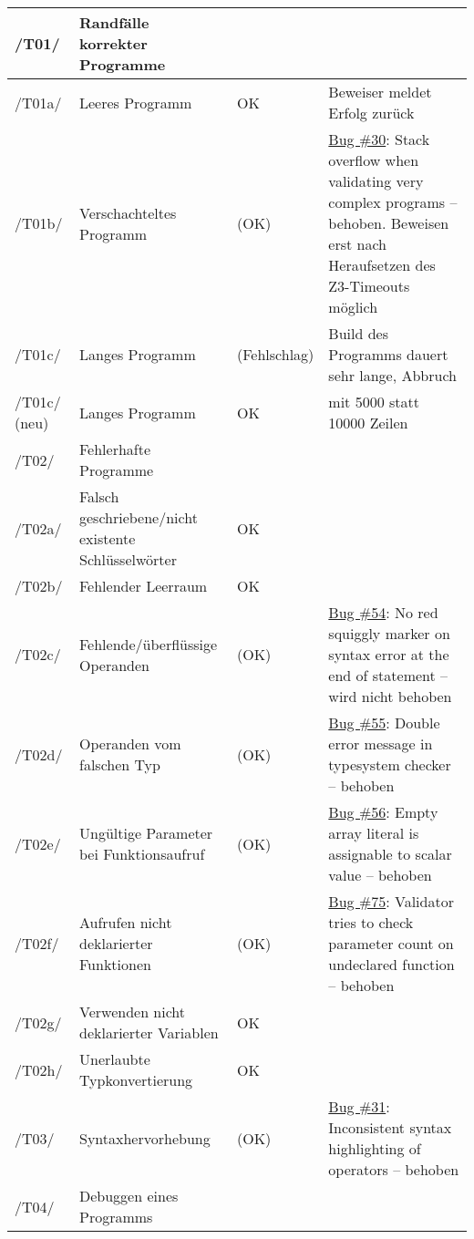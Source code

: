 \begin{landscape}
\begin{longtable}{lp{8cm}lp{10cm}}
/T01/ & Randfälle korrekter Programme &  &  \\ \midrule
/T01a/ & Leeres Programm & OK & Beweiser meldet Erfolg zurück \\ \midrule
/T01b/ & Verschachteltes Programm & (OK) & \href{https://github.com/team-worthwhile/worthwhile/issues/30}{\href{https://github.com/team-worthwhile/worthwhile/issues/30}{Bug \#30}}: Stack overflow when validating very complex programs – behoben. Beweisen erst nach Heraufsetzen des Z3-Timeouts möglich \\ \midrule
/T01c/ & Langes Programm & (Fehlschlag) & Build des Programms dauert sehr lange, Abbruch \\ \midrule
/T01c/ (neu) & Langes Programm & OK & mit 5000 statt 10000 Zeilen \\ \midrule
\midrule
/T02/ & Fehlerhafte Programme &  &  \\ \midrule
/T02a/ & Falsch geschriebene/nicht existente Schlüsselwörter & OK &  \\ \midrule
/T02b/ & Fehlender Leerraum & OK &  \\ \midrule
/T02c/ & Fehlende/überflüssige Operanden & (OK) & \href{https://github.com/team-worthwhile/worthwhile/issues/54}{Bug \#54}: No red squiggly marker on syntax error at the end of statement -- wird nicht behoben \\ \midrule
/T02d/ & Operanden vom falschen Typ & (OK) & \href{https://github.com/team-worthwhile/worthwhile/issues/55}{Bug \#55}: Double error message in typesystem checker – behoben \\ \midrule
/T02e/ & Ungültige Parameter bei Funktionsaufruf & (OK) & \href{https://github.com/team-worthwhile/worthwhile/issues/56}{Bug \#56}: Empty array literal is assignable to scalar value – behoben \\ \midrule
/T02f/ & Aufrufen nicht deklarierter Funktionen & (OK) & \href{https://github.com/team-worthwhile/worthwhile/issues/75}{Bug \#75}: Validator tries to check parameter count on undeclared function -- behoben \\ \midrule
/T02g/ & Verwenden nicht deklarierter Variablen & OK &  \\ \midrule
/T02h/ & Unerlaubte Typkonvertierung & OK &  \\ \midrule
\midrule
/T03/ & Syntaxhervorhebung & (OK) & \href{https://github.com/team-worthwhile/worthwhile/issues/31}{Bug \#31}: Inconsistent syntax highlighting of operators – behoben \\ \midrule
\midrule
/T04/ & Debuggen eines Programms &  &  \\ \midrule

\end{longtable}
\end{landscape}
